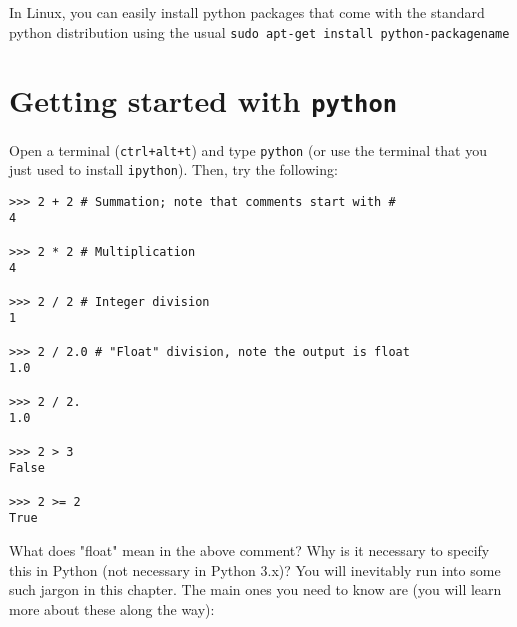 \begin{tipbox}
In Linux, you can easily install python packages that come with the 
standard python distribution using the usual {\tt sudo apt-get install 
python-packagename}
\end{tipbox}
 
\section{Getting started with {\tt python}}
Open a terminal ({\tt ctrl+alt+t}) and type {\tt python} (or use the 
terminal that you just used to install {\tt ipython}). Then, try the 
following:
\begin{lstlisting}
>>> 2 + 2 # Summation; note that comments start with #
4

>>> 2 * 2 # Multiplication
4

>>> 2 / 2 # Integer division
1

>>> 2 / 2.0 # "Float" division, note the output is float
1.0

>>> 2 / 2.
1.0

>>> 2 > 3
False

>>> 2 >= 2
True
\end{lstlisting}

What does "float" mean in the above comment? Why is it necessary to 
specify this in Python (not necessary in Python 3.x)? You will 
inevitably run into some such jargon in this chapter. The main ones you 
need to know are (you will learn more about these along the way):

